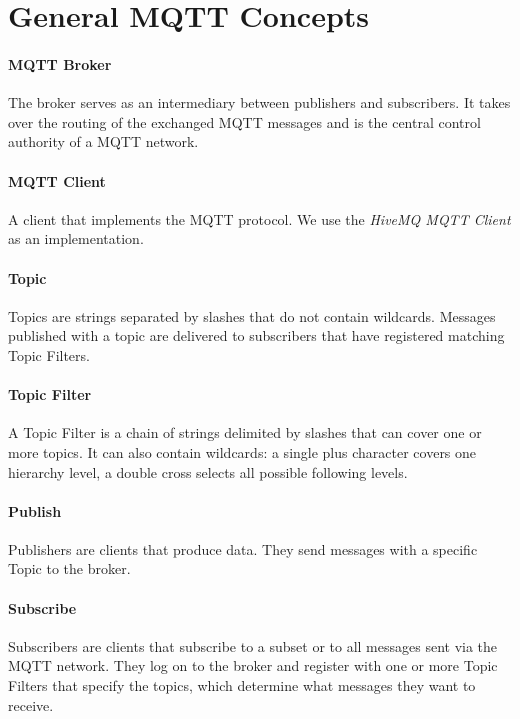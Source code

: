 \section{General MQTT Concepts}

\paragraph{MQTT Broker}
The broker serves as an intermediary between publishers and subscribers.
It takes over the routing of the exchanged MQTT messages and is the central control authority of a MQTT network.

\paragraph{MQTT Client}
A client that implements the MQTT protocol.
We use the \emph{HiveMQ MQTT Client} as an implementation.

\paragraph{Topic}
Topics are strings separated by slashes that do not contain wildcards.
Messages published with a topic are delivered to subscribers that have registered matching Topic Filters.

\paragraph{Topic Filter}
A Topic Filter is a chain of strings delimited by slashes that 
can cover one or more topics. 
It can also contain wildcards: a single plus character covers one hierarchy level, a double cross selects all possible following levels.

\paragraph{Publish}
Publishers are clients that produce data.
They send messages with a specific Topic to the broker.

\paragraph{Subscribe}
Subscribers are clients that subscribe to a subset or to all messages sent via the
MQTT network.
They log on to the broker and register with one or more Topic Filters that specify the topics, which determine what messages they want to receive.



